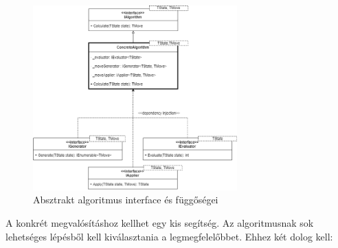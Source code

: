 \documentclass[twoside, a4paper, 12pt]{article}
\begin{document}
\begin{figure}[htbp]
	\centering
	\includegraphics[width=0.7\textwidth]{img/algorithmAbstractDiagram.png}
	\caption{Absztrakt algoritmus interface és függőségei}
	\label{fig:algorithmAbstractDiagram}
\end{figure}

A konkrét megvalósításhoz kellhet egy kis segítség. Az algoritmusnak sok lehetséges lépésből kell kiválasztania a legmegfelelőbbet. Ehhez két dolog kell:
\end{document}
